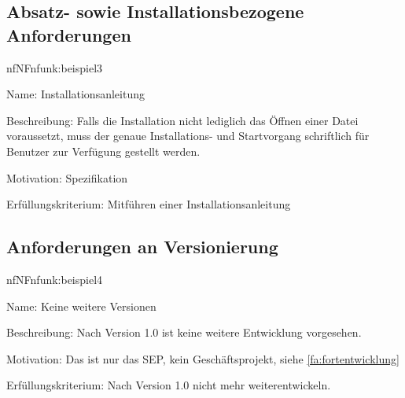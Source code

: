 %

\subsection{Absatz- sowie Installationsbezogene Anforderungen}

\begin{description}[leftmargin=5em, style=sameline]	
	\begin{lhp}{nf}{NF}{nfunk:beispiel3}
		\item [Name:] Installationsanleitung	
		\item [Beschreibung:] Falls die Installation nicht lediglich das Öffnen einer Datei voraussetzt, muss der genaue Installations- und Startvorgang schriftlich für Benutzer zur Verfügung gestellt werden.
		\item [Motivation:] Spezifikation
		\item [Erfüllungskriterium:] Mitführen einer Installationsanleitung %
	\end{lhp}
\end{description}

\subsection{Anforderungen an Versionierung}

\begin{description}[leftmargin=5em, style=sameline]	
	\begin{lhp}{nf}{NF}{nfunk:beispiel4}
		\item [Name:] Keine weitere Versionen
		\item [Beschreibung:] Nach Version 1.0 ist keine weitere Entwicklung vorgesehen.
		\item [Motivation:] Das ist nur das SEP, kein Geschäftsprojekt, siehe \ref{fa:fortentwicklung}
		\item [Erfüllungskriterium:] Nach Version 1.0 nicht mehr weiterentwickeln. %
	\end{lhp}
\end{description}


